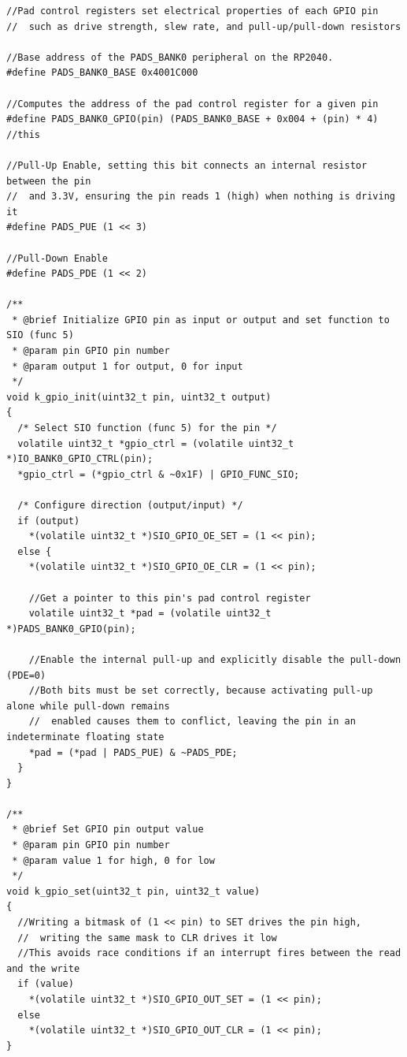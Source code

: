 \documentclass[12pt,letterpaper]{article}
\begin{document}
\begin{lstlisting}[style=modernc, caption={kernel\_drivers.c}]
//Pad control registers set electrical properties of each GPIO pin
//  such as drive strength, slew rate, and pull-up/pull-down resistors
  
//Base address of the PADS_BANK0 peripheral on the RP2040.
#define PADS_BANK0_BASE 0x4001C000

//Computes the address of the pad control register for a given pin
#define PADS_BANK0_GPIO(pin) (PADS_BANK0_BASE + 0x004 + (pin) * 4) //this

//Pull-Up Enable, setting this bit connects an internal resistor between the pin
//  and 3.3V, ensuring the pin reads 1 (high) when nothing is driving it
#define PADS_PUE (1 << 3)

//Pull-Down Enable
#define PADS_PDE (1 << 2)

/**
 * @brief Initialize GPIO pin as input or output and set function to SIO (func 5)
 * @param pin GPIO pin number
 * @param output 1 for output, 0 for input
 */
void k_gpio_init(uint32_t pin, uint32_t output)
{
  /* Select SIO function (func 5) for the pin */
  volatile uint32_t *gpio_ctrl = (volatile uint32_t *)IO_BANK0_GPIO_CTRL(pin);
  *gpio_ctrl = (*gpio_ctrl & ~0x1F) | GPIO_FUNC_SIO;

  /* Configure direction (output/input) */
  if (output)
    *(volatile uint32_t *)SIO_GPIO_OE_SET = (1 << pin);
  else {
    *(volatile uint32_t *)SIO_GPIO_OE_CLR = (1 << pin);

    //Get a pointer to this pin's pad control register
    volatile uint32_t *pad = (volatile uint32_t *)PADS_BANK0_GPIO(pin);

    //Enable the internal pull-up and explicitly disable the pull-down (PDE=0)
    //Both bits must be set correctly, because activating pull-up alone while pull-down remains
    //  enabled causes them to conflict, leaving the pin in an indeterminate floating state
    *pad = (*pad | PADS_PUE) & ~PADS_PDE;
  }
}

/**
 * @brief Set GPIO pin output value
 * @param pin GPIO pin number
 * @param value 1 for high, 0 for low
 */
void k_gpio_set(uint32_t pin, uint32_t value)
{
  //Writing a bitmask of (1 << pin) to SET drives the pin high,
  //  writing the same mask to CLR drives it low
  //This avoids race conditions if an interrupt fires between the read and the write
  if (value)
    *(volatile uint32_t *)SIO_GPIO_OUT_SET = (1 << pin);
  else
    *(volatile uint32_t *)SIO_GPIO_OUT_CLR = (1 << pin);
}


\end{lstlisting}
\end{document}
